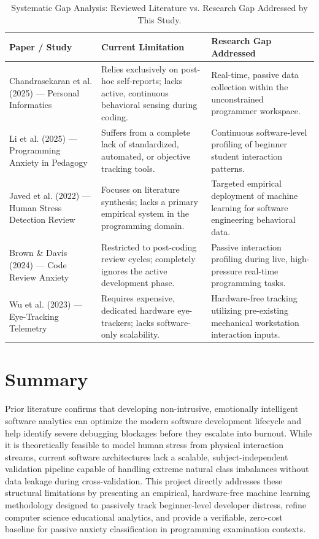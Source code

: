 \begin{table}[htbp]
\centering
\small
\caption{Systematic Gap Analysis: Reviewed Literature vs. Research Gap Addressed by This Study.}
\label{tab:gap_analysis}
\begin{tabular}{|p{4.2cm}|p{5.1cm}|p{5.1cm}|}
\hline
\textbf{Paper / Study} & \textbf{Current Limitation} & \textbf{Research Gap Addressed} \\ \hline
Chandrasekaran et al. (2025) --- Personal Informatics & Relies exclusively on post-hoc self-reports; lacks active, continuous behavioral sensing during coding. & Real-time, passive data collection within the unconstrained programmer workspace. \\ \hline
Li et al. (2025) --- Programming Anxiety in Pedagogy & Suffers from a complete lack of standardized, automated, or objective tracking tools. & Continuous software-level profiling of beginner student interaction patterns. \\ \hline
Javed et al. (2022) --- Human Stress Detection Review & Focuses on literature synthesis; lacks a primary empirical system in the programming domain. & Targeted empirical deployment of machine learning for software engineering behavioral data. \\ \hline
Brown \& Davis (2024) --- Code Review Anxiety & Restricted to post-coding review cycles; completely ignores the active development phase. & Passive interaction profiling during live, high-pressure real-time programming tasks. \\ \hline
Wu et al. (2023) --- Eye-Tracking Telemetry & Requires expensive, dedicated hardware eye-trackers; lacks software-only scalability. & Hardware-free tracking utilizing pre-existing mechanical workstation interaction inputs. \\ \hline
\end{tabular}
\end{table}

\section{Summary}
Prior literature confirms that developing non-intrusive, emotionally intelligent software analytics can optimize the modern software development lifecycle and help identify severe debugging blockages before they escalate into burnout. While it is theoretically feasible to model human stress from physical interaction streams, current software architectures lack a scalable, subject-independent validation pipeline capable of handling extreme natural class imbalances without data leakage during cross-validation. This project directly addresses these structural limitations by presenting an empirical, hardware-free machine learning methodology designed to passively track beginner-level developer distress, refine computer science educational analytics, and provide a verifiable, zero-cost baseline for passive anxiety classification in programming examination contexts.